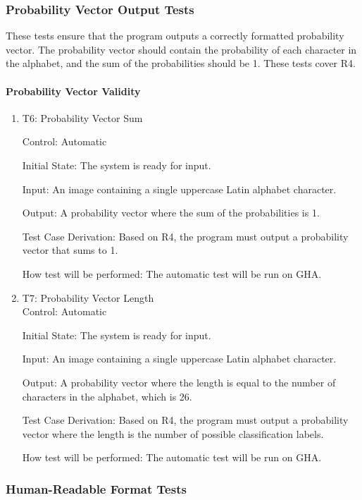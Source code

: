 \documentclass[12pt, titlepage]{article}
\begin{document}
\subsubsection{Probability Vector Output Tests}

These tests ensure that the program outputs a correctly formatted probability
vector. The probability vector should contain the probability of each character
in the alphabet, and the sum of the probabilities should be 1. These tests
cover R4.

\paragraph{Probability Vector Validity}

\begin{enumerate}

\item{T6: Probability Vector Sum\\}

Control: Automatic

Initial State: The \progname{} system is ready for input.

Input: An image containing a single uppercase Latin alphabet character.

Output: A probability vector where the sum of the probabilities is 1.

Test Case Derivation: Based on R4, the program must output a probability vector
that sums to 1.

How test will be performed: The automatic test will be run on GHA.

\item{T7: Probability Vector Length\\}
Control: Automatic

Initial State: The \progname{} system is ready for input.

Input: An image containing a single uppercase Latin alphabet character.

Output: A probability vector where the length is equal to the number of
characters in the alphabet, which is 26.

Test Case Derivation: Based on R4, the program must output a probability vector
where the length is the number of possible classification labels.

How test will be performed: The automatic test will be run on GHA.

\end{enumerate}

\subsubsection{Human-Readable Format Tests}
\end{document}
